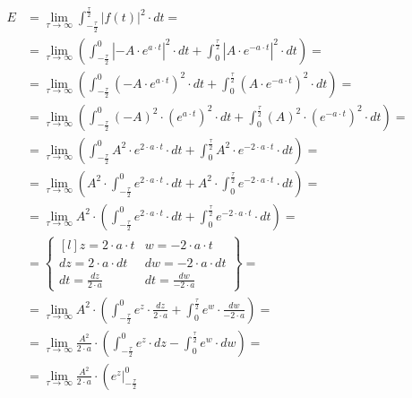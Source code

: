 \begin{task}
\begin{align*}
E&=\lim_{\tau \rightarrow \infty}\int_{-\frac{\tau}{2}}^{\frac{\tau}{2}}\left|f(t)\right|^2 \cdot dt=\\
 &=\lim_{\tau \rightarrow \infty} \left( 
   \int_{-\frac{\tau}{2}}^{0}\left| -A \cdot e^{a\cdot t} \right|^2 \cdot dt 
 + \int_{0}^{\frac{\tau}{2}}\left| A \cdot e^{-a\cdot t} \right|^2 \cdot dt \right)=\\
 &=\lim_{\tau \rightarrow \infty} \left( 
   \int_{-\frac{\tau}{2}}^{0}\left( -A \cdot e^{a\cdot t} \right)^2 \cdot dt 
 + \int_{0}^{\frac{\tau}{2}}\left( A \cdot e^{-a\cdot t} \right)^2 \cdot dt \right)=\\
 &=\lim_{\tau \rightarrow \infty} \left( 
   \int_{-\frac{\tau}{2}}^{0}\left( -A\right)^2 \cdot \left(e^{a\cdot t} \right)^2 \cdot dt 
 + \int_{0}^{\frac{\tau}{2}}\left( A \right)^2 \cdot \left(e^{-a\cdot t} \right)^2 \cdot dt \right)=\\
 &=\lim_{\tau \rightarrow \infty} \left( 
   \int_{-\frac{\tau}{2}}^{0} A^2 \cdot e^{2\cdot a\cdot t} \cdot dt 
 + \int_{0}^{\frac{\tau}{2}} A^2 \cdot e^{-2 \cdot a\cdot t} \cdot dt \right)=\\
 &=\lim_{\tau \rightarrow \infty} \left( 
    A^2 \cdot \int_{-\frac{\tau}{2}}^{0}  e^{2\cdot a\cdot t} \cdot dt 
 +  A^2 \cdot \int_{0}^{\frac{\tau}{2}} e^{-2 \cdot a\cdot t} \cdot dt \right)=\\
 &=\lim_{\tau \rightarrow \infty} A^2 \cdot \left( 
   \int_{-\frac{\tau}{2}}^{0}  e^{2\cdot a\cdot t} \cdot dt 
 + \int_{0}^{\frac{\tau}{2}} e^{-2 \cdot a\cdot t} \cdot dt \right)=\\
 &=\begin{Bmatrix*}[l]
   z=2\cdot a \cdot t & w=-2 \cdot a \cdot t\\
   dz = 2 \cdot a \cdot dt & dw=-2 \cdot a \cdot dt\\
   dt = \frac{dz}{2\cdot a} & dt = \frac{dw}{-2 \cdot a}
   \end{Bmatrix*}=\\
 &=\lim_{\tau \rightarrow \infty} A^2 \cdot \left( 
    \int_{-\frac{\tau}{2}}^{0}  e^{z} \cdot \frac{dz}{2\cdot a} 
 +  \int_{0}^{\frac{\tau}{2}} e^{w} \cdot \frac{dw}{-2\cdot a} \right)=\\
 &=\lim_{\tau \rightarrow \infty} \frac{A^2}{2\cdot a} \cdot \left( 
    \int_{-\frac{\tau}{2}}^{0}  e^{z} \cdot dz 
 -  \int_{0}^{\frac{\tau}{2}} e^{w} \cdot dw \right)=\\
 &=\lim_{\tau \rightarrow \infty} \frac{A^2}{2\cdot a} \cdot \left( 
    \left. e^{z} \right|_{-\frac{\tau}{2}}^{0} 

\end{align*}
\end{task}
